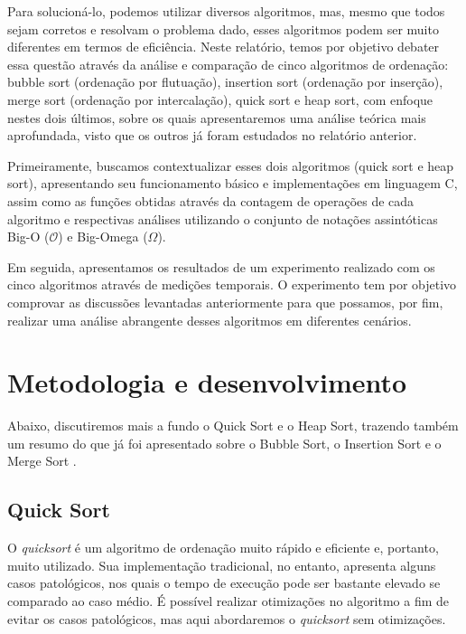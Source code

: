 \documentclass[fontsize=10pt]{article}
\begin{document}
    \quad Para solucioná-lo, podemos utilizar diversos algoritmos, mas, mesmo que todos sejam corretos e resolvam o problema dado, esses algoritmos podem ser muito diferentes em termos de eficiência. Neste relatório, temos por objetivo debater essa questão através da análise e comparação de cinco algoritmos de ordenação: bubble sort (ordenação por flutuação), insertion sort (ordenação por inserção), merge sort (ordenação por intercalação), quick sort e heap sort, com enfoque nestes dois últimos, sobre os quais apresentaremos uma análise teórica mais aprofundada, visto que os outros já foram estudados no relatório anterior\cite{relatorio1}. 
    
    \quad Primeiramente, buscamos contextualizar esses dois algoritmos (quick sort e heap sort), apresentando seu funcionamento básico e implementações em linguagem C, assim como as funções obtidas através da contagem de operações de cada algoritmo e respectivas análises utilizando o conjunto de notações assintóticas Big-O ($\mathcal{O}$) e Big-Omega ($\Omega$).
    
    \quad Em seguida, apresentamos os resultados de um experimento realizado com os cinco algoritmos através de medições temporais. O experimento tem por objetivo comprovar as discussões levantadas anteriormente para que possamos, por fim, realizar uma análise abrangente desses algoritmos em diferentes cenários.


\section{Metodologia e desenvolvimento}

\quad Abaixo, discutiremos mais a fundo o Quick Sort e o Heap Sort, trazendo também um resumo do que já foi apresentado sobre o Bubble Sort, o Insertion Sort e o Merge Sort \cite{relatorio1}.

\subsection{Quick Sort}

\quad O \textit{quicksort} é um algoritmo de ordenação muito rápido e eficiente e, portanto, muito utilizado. Sua implementação tradicional, no entanto, apresenta alguns casos patológicos, nos quais o tempo de execução pode ser bastante elevado se comparado ao caso médio. É possível realizar otimizações no algoritmo a fim de evitar os casos patológicos, mas aqui abordaremos o \textit{quicksort} sem otimizações.
\end{document}
